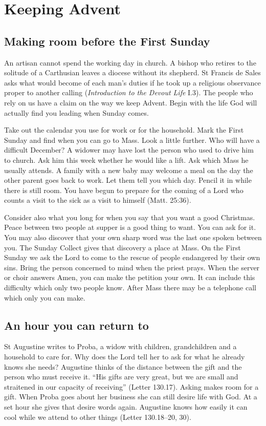 \section{Keeping Advent}

\subsection{Making room before the First Sunday}

An artisan cannot spend the working day in church. A bishop who retires
to the solitude of a Carthusian leaves a diocese without its shepherd.
St Francis de Sales asks what would become of each man's duties if he took up
a religious observance proper to another calling (\emph{Introduction to the Devout Life} I.3). The
people who rely on us have a claim on the way we keep Advent. Begin
with the life God will actually find you leading when Sunday comes.

Take out the calendar you use for work or for the household. Mark the
First Sunday and find when you can go to Mass. Look a little further.
Who will have a difficult December? A widower may have lost the person
who used to drive him to church. Ask him this week whether he would
like a lift. Ask which Mass he usually attends. A family with a new
baby may welcome a meal on the day the other parent goes back to work.
Let them tell you which day. Pencil it in while there is still room.
You have begun to prepare for the coming of a Lord who counts a visit
to the sick as a visit to himself (Matt. 25:36).

Consider also what you long for when you say that you want a good
Christmas. Peace between two people at supper is a good thing to want.
You can ask for it. You may also discover that your own sharp word was
the last one spoken between you. The Sunday Collect gives that discovery a place at Mass.
On the First Sunday we ask the Lord to come to the rescue of people
endangered by their own sins. Bring the person concerned to mind when
the priest prays. When the server or choir answers Amen, you can make the
petition your own. It can include this difficulty which only two people know. After Mass there may be a telephone call
which only you can make.

\subsection{An hour you can return to}

St Augustine writes to Proba, a widow with children, grandchildren and
a household to care for. Why does the Lord tell her to ask for what he
already knows she needs? Augustine thinks of the distance between the gift
and the person who must receive it. “His gifts are very great, but we are
small and straitened in our capacity of receiving” (Letter 130.17). Asking
makes room for a gift. When Proba goes about her business she can still
desire life with God. At a set hour she gives that desire words again.
Augustine knows how easily it can cool while we attend to other things
(Letter 130.18--20, 30).

